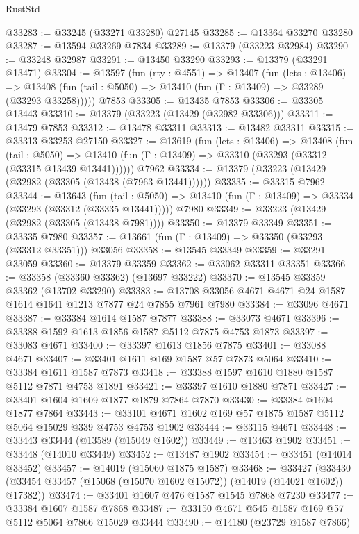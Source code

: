 \begin{lexlean}{RustStd}
\begin{coremodule}
@33283 := @33245 (@33271 @33280) @27145
@33285 := @13364 @33270 @33280
@33287 := @13594 @33269 @7834
@33289 := @13379 (@33223 @32984)
@33290 := @33248 @32987
@33291 := @13450 @33290
@33293 := @13379 (@33291 @13471)
@33304 := @13597
    (fun (rty : @4551) =>
    @13407
      (fun (lets : @13406) =>
      @13408 (fun (tail : @5050) => @13410 (fun (Γ : @13409) => @33289 (@33293 @33258)))))
    @7853
@33305 := @13435 @7853
@33306 := @33305 @13443
@33310 := @13379 (@33223 (@13429 (@32982 @33306)))
@33311 := @13479 @7853
@33312 := @13478 @33311
@33313 := @13482 @33311
@33315 := @33313 @33253 @27150
@33327 := @13619
    (fun (lets : @13406) =>
    @13408
      (fun (tail : @5050) =>
      @13410 (fun (Γ : @13409) => @33310 (@33293 (@33312 (@33315 @13439 @13441))))))
    @7962
@33334 := @13379 (@33223 (@13429 (@32982 (@33305 (@13438 (@7963 @13441))))))
@33335 := @33315 @7962
@33344 := @13643
    (fun (tail : @5050) => @13410 (fun (Γ : @13409) => @33334 (@33293 (@33312 (@33335 @13441)))))
    @7980
@33349 := @33223 (@13429 (@32982 (@33305 (@13438 @7981))))
@33350 := @13379 @33349
@33351 := @33335 @7980
@33357 := @13661 (fun (Γ : @13409) => @33350 (@33293 (@33312 @33351))) @33056
@33358 := @13545 @33349
@33359 := @33291 @33059
@33360 := @13379 @33359
@33362 := @33062 @33311 @33351
@33366 := @33358 (@33360 @33362) (@13697 @33222)
@33370 := @13545 @33359 @33362 (@13702 @33290)
@33383 := @13708 @33056 @4671 @4671 @24 @1587 @1614 @1641 @1213 @7877 @24 @7855 @7961 @7980
@33384 := @33096 @4671
@33387 := @33384 @1614 @1587 @7877
@33388 := @33073 @4671
@33396 := @33388 @1592 @1613 @1856 @1587 @5112 @7875 @4753 @1873
@33397 := @33083 @4671
@33400 := @33397 @1613 @1856 @7875
@33401 := @33088 @4671
@33407 := @33401 @1611 @169 @1587 @57 @7873 @5064
@33410 := @33384 @1611 @1587 @7873
@33418 := @33388 @1597 @1610 @1880 @1587 @5112 @7871 @4753 @1891
@33421 := @33397 @1610 @1880 @7871
@33427 := @33401 @1604 @1609 @1877 @1879 @7864 @7870
@33430 := @33384 @1604 @1877 @7864
@33443 := @33101 @4671 @1602 @169 @57 @1875 @1587 @5112 @5064 @15029 @339 @4753 @4753 @1902
@33444 := @33115 @4671
@33448 := @33443 @33444 (@13589 (@15049 @1602))
@33449 := @13463 @1902
@33451 := @33448 (@14010 @33449)
@33452 := @13487 @1902
@33454 := @33451 (@14014 @33452)
@33457 := @14019 (@15060 @1875 @1587)
@33468 := @33427
    (@33430 (@33454 @33457 (@15068 (@15070 @1602 @15072)) (@14019 (@14021 @1602)) @17382))
@33474 := @33401 @1607 @476 @1587 @1545 @7868 @7230
@33477 := @33384 @1607 @1587 @7868
@33487 := @33150 @4671 @545 @1587 @169 @57 @5112 @5064 @7866 @15029 @33444
@33490 := @14180 (@23729 @1587 @7866)

\end{coremodule}
\end{lexlean}
